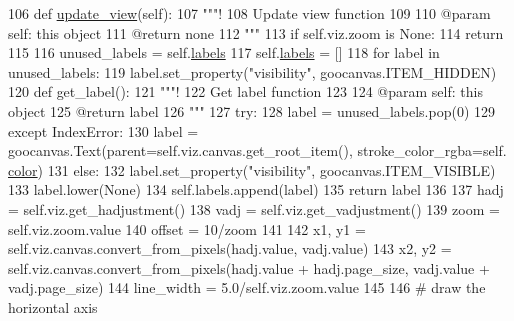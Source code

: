 \begin{DoxyCode}
106     \textcolor{keyword}{def }\hyperlink{classvisualizer_1_1hud_1_1Axes_aa14ec1cc14c11d259fea914a9dd23fb8}{update\_view}(self):
107         \textcolor{stringliteral}{"""!}
108 \textcolor{stringliteral}{        Update view function}
109 \textcolor{stringliteral}{        }
110 \textcolor{stringliteral}{        @param self: this object}
111 \textcolor{stringliteral}{        @return none}
112 \textcolor{stringliteral}{        """}
113         \textcolor{keywordflow}{if} self.viz.zoom \textcolor{keywordflow}{is} \textcolor{keywordtype}{None}:
114             \textcolor{keywordflow}{return}
115 
116         unused\_labels = self.\hyperlink{classvisualizer_1_1hud_1_1Axes_a8f7a1ac8f65e14502dfb45b127b7b9df}{labels}
117         self.\hyperlink{classvisualizer_1_1hud_1_1Axes_a8f7a1ac8f65e14502dfb45b127b7b9df}{labels} = []
118         \textcolor{keywordflow}{for} label \textcolor{keywordflow}{in} unused\_labels:
119             label.set\_property(\textcolor{stringliteral}{"visibility"}, goocanvas.ITEM\_HIDDEN)
120         \textcolor{keyword}{def }get\_label():
121             \textcolor{stringliteral}{"""!}
122 \textcolor{stringliteral}{            Get label function}
123 \textcolor{stringliteral}{        }
124 \textcolor{stringliteral}{            @param self: this object}
125 \textcolor{stringliteral}{            @return label}
126 \textcolor{stringliteral}{            """}
127             \textcolor{keywordflow}{try}:
128                 label = unused\_labels.pop(0)
129             \textcolor{keywordflow}{except} IndexError:
130                 label = goocanvas.Text(parent=self.viz.canvas.get\_root\_item(), stroke\_color\_rgba=self.
      \hyperlink{classvisualizer_1_1hud_1_1Axes_ad728f986aa77a67a9ac95ee7ce7f56a9}{color})
131             \textcolor{keywordflow}{else}:
132                 label.set\_property(\textcolor{stringliteral}{"visibility"}, goocanvas.ITEM\_VISIBLE)
133                 label.lower(\textcolor{keywordtype}{None})
134             self.labels.append(label)
135             \textcolor{keywordflow}{return} label
136 
137         hadj = self.viz.get\_hadjustment()
138         vadj = self.viz.get\_vadjustment()
139         zoom = self.viz.zoom.value
140         offset = 10/zoom
141 
142         x1, y1 = self.viz.canvas.convert\_from\_pixels(hadj.value, vadj.value)
143         x2, y2 = self.viz.canvas.convert\_from\_pixels(hadj.value + hadj.page\_size, vadj.value + 
      vadj.page\_size)
144         line\_width = 5.0/self.viz.zoom.value
145 
146         \textcolor{comment}{# draw the horizontal axis}

\end{DoxyCode}
